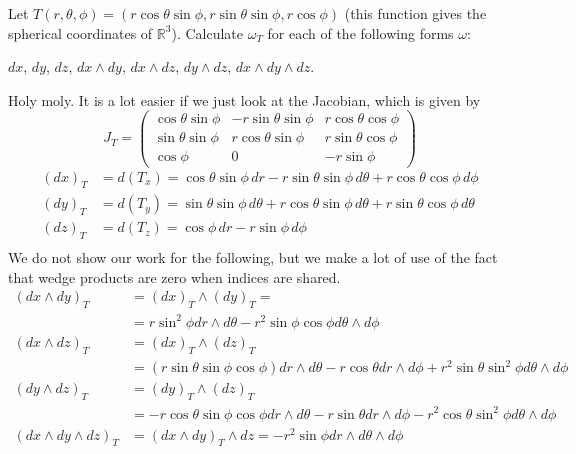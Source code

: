 \documentclass[11pt]{article}
\begin{document}
Let $T (r, \theta, \phi) = (r \cos \theta \sin\phi, r \sin \theta \sin\phi, r \cos\phi)$ (this function gives the spherical coordinates of $\mathbb{R}^3$). Calculate $\omega_T$ for each of the following forms $\omega$:

$dx$, $dy$, $dz$, $dx \wedge dy$, $dx \wedge dz$, $dy \wedge dz$, $dx \wedge dy \wedge dz$.
\begin{solution}
    Holy moly. It is a lot easier if we just look at the Jacobian, which is given by 
    \[J_T = \begin{pmatrix}
    \cos \theta \sin\phi & -r\sin \theta \sin \phi & r\cos \theta \cos \phi\\\sin \theta \sin \phi & r\cos \theta \sin \phi & r\sin \theta \cos \phi\\\cos \phi & 0 & -r\sin \phi
    \end{pmatrix}\]
    \begin{align*}
        (dx)_T &= d(T_x) = \cos \theta \sin\phi \,dr -r\sin \theta \sin\phi \,d\theta + r\cos \theta \cos \phi \, d\phi\\
        (dy)_T &= d(T_y) = \sin \theta \sin \phi \,d\theta +r\cos \theta \sin \phi\,d\theta + r\sin \theta \cos \phi\,d\theta\\
        (dz)_T &= d(T_z) = \cos \phi \,dr - r\sin \phi \, d\phi\\
    \end{align*}
    We do not show our work for the following, but we make a lot of use of the fact that wedge products are zero when indices are shared.
    \begin{align*}
        (dx \wedge dy)_T &= (dx)_T \wedge (dy)_T =  \\
        &= r\sin ^2 \phi dr \wedge d\theta - r^2 \sin \phi \cos \phi d\theta \wedge d\phi\\
        (dx \wedge dz)_T &= (dx)_T \wedge (dz)_T \\
        &= (r\sin \theta \sin \phi \cos \phi)dr\wedge d\theta - r\cos \theta dr \wedge d\phi + r^2 \sin \theta \sin^2 \phi d\theta \wedge d\phi\\
        (dy \wedge dz)_T &= (dy)_T \wedge (dz)_T\\
        &= -r\cos \theta \sin \phi \cos \phi dr \wedge d\theta - r\sin \theta dr\wedge d\phi - r^2 \cos \theta\sin^2 \phi d\theta \wedge d\phi\\
        (dx \wedge dy \wedge dz)_T &= (dx\wedge dy)_T \wedge dz = -r^2 \sin \phi dr\wedge d\theta \wedge d\phi
    \end{align*}
\end{solution}
\newpage
\end{document}
